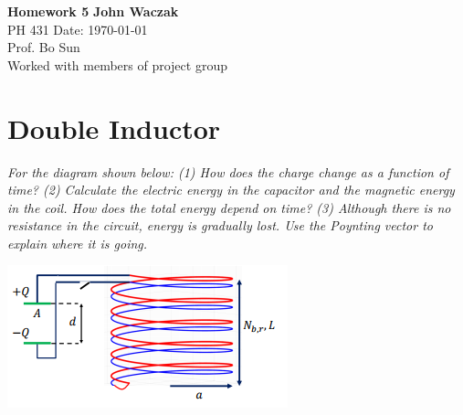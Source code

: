 \documentclass[a4paper, 11pt]{article}
\begin{document}
\noindent
\large\textbf{Homework 5} \hfill \textbf{John Waczak} \\
\normalsize PH 431 \hfill  Date: \today \\
Prof. Bo Sun  \\
Worked with members of project group \\ 

\section*{Double Inductor}
\textit{For the diagram shown below: (1) How does the charge change as a function of time? (2) Calculate the electric energy in the capacitor and the magnetic energy in the coil. How does the total energy depend on time? (3) Although there is no resistance in the circuit, energy is gradually lost. Use the Poynting vector to explain where it is going.} \\
		\begin{center}
			\includegraphics[scale=0.75]{circuit1}
		\end{center}
\end{document}
